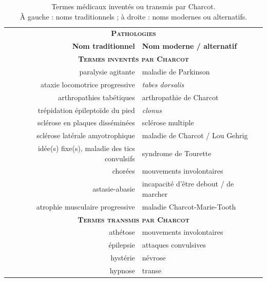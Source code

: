 \begin{table}[h]
	\centering
	\begin{tabular}{rl}
		\hline\hline
		\multicolumn{2}{c}{\textbf{\textsc{Pathologies}}} \\
		\textbf{Nom traditionnel} & \textbf{Nom moderne / alternatif} \\
		\multicolumn{2}{c}{\textbf{\textsc{Termes inventés par Charcot}}} \\
		\hline
		paralysie agitante & maladie de Parkinson\\
		ataxie locomotrice progressive & \textit{tabes dorsalis}\\
		arthropathies tabétiques & arthropathie de Charcot\\
		trépidation épileptoïde du pied & \textit{clonus}\\
		sclérose en plaques disséminées & sclérose multiple\\
		sclérose latérale amyotrophique & maladie de Charcot / Lou Gehrig\\
		idée(s) fixe(s), maladie des tics convulsifs & syndrome de Tourette\\
		chorées & mouvements involontaires\\
		astasie-abasie & incapacité d'être debout / de marcher\\
		atrophie musculaire progressive & maladie Charcot-Marie-Tooth\\
		\hline
		\multicolumn{2}{c}{\textbf{\textsc{Termes transmis par Charcot}}} \\
		athétose & mouvements involontaires\\
		épilepsie & attaques convulsives \\
		hystérie & névrose \\
		hypnose & transe \\
		\hline\hline
	\end{tabular}
	\caption{Termes médicaux inventés ou transmis par Charcot. \\
		À gauche : noms traditionnels ; à droite : noms modernes ou alternatifs.}
	\label{tab:contributions_charcot}
\end{table}



